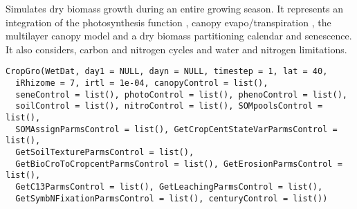 \documentclass[letterpaper]{book}
\begin{document}
%
\begin{Description}\relax
Simulates dry biomass growth during an entire growing
season.  It represents an integration of the photosynthesis
function , canopy evapo/transpiration
, the multilayer canopy model
 and a dry biomass partitioning calendar
and senescence. It also considers, carbon and nitrogen
cycles and water and nitrogen limitations.
\end{Description}
%
\begin{Usage}
\begin{verbatim}
CropGro(WetDat, day1 = NULL, dayn = NULL, timestep = 1, lat = 40,
  iRhizome = 7, irtl = 1e-04, canopyControl = list(),
  seneControl = list(), photoControl = list(), phenoControl = list(),
  soilControl = list(), nitroControl = list(), SOMpoolsControl = list(),
  SOMAssignParmsControl = list(), GetCropCentStateVarParmsControl = list(),
  GetSoilTextureParmsControl = list(),
  GetBioCroToCropcentParmsControl = list(), GetErosionParmsControl = list(),
  GetC13ParmsControl = list(), GetLeachingParmsControl = list(),
  GetSymbNFixationParmsControl = list(), centuryControl = list())
\end{verbatim}
\end{Usage}
%
\end{document}
